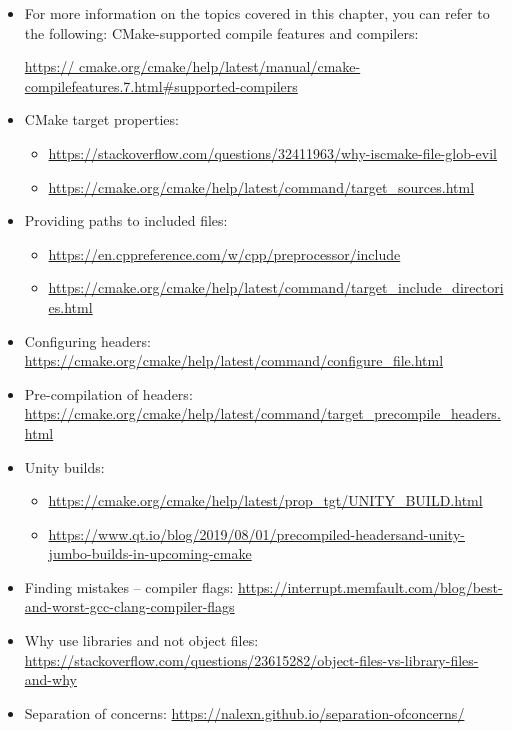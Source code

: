 \begin{itemize}
\item 
For more information on the topics covered in this chapter, you can refer to the following: CMake-supported compile features and compilers:

\url{https:// cmake.org/cmake/help/latest/manual/cmake-compilefeatures.7.html\#supported-compilers}

\item 
CMake target properties:

\begin{itemize}
\item 
\url{https://stackoverflow.com/questions/32411963/why-iscmake-file-glob-evil}

\item 
\url{https://cmake.org/cmake/help/latest/command/target_sources.html}
\end{itemize}

\item 
Providing paths to included files:

\begin{itemize}
\item 
\url{https://en.cppreference.com/w/cpp/preprocessor/include}

\item 
\url{https://cmake.org/cmake/help/latest/command/target_include_directories.html}
\end{itemize}

\item 
Configuring headers: \url{https://cmake.org/cmake/help/latest/command/configure_file.html}

\item 
Pre-compilation of headers: \url{https://cmake.org/cmake/help/latest/command/target_precompile_headers.html}

\item 
Unity builds:

\begin{itemize}
\item 
\url{https://cmake.org/cmake/help/latest/prop_tgt/UNITY_BUILD.html}

\item 
\url{https://www.qt.io/blog/2019/08/01/precompiled-headersand-unity-jumbo-builds-in-upcoming-cmake}
\end{itemize}

\item 
Finding mistakes – compiler flags: \url{https://interrupt.memfault.com/blog/best-and-worst-gcc-clang-compiler-flags}

\item 
Why use libraries and not object files: \url{https://stackoverflow.com/questions/23615282/object-files-vs-library-files-and-why}

\item 
Separation of concerns: \url{https://nalexn.github.io/separation-ofconcerns/}
\end{itemize}









